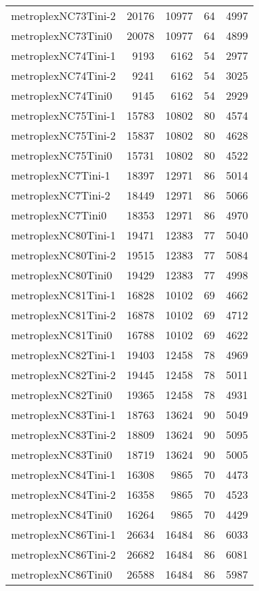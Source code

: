 \begin{longtable}{lrrrr}
metroplexNC73Tini-2 & 20176 & 10977 & 64 & 4997 \\
metroplexNC73Tini0 & 20078 & 10977 & 64 & 4899 \\
metroplexNC74Tini-1 & 9193 & 6162 & 54 & 2977 \\
metroplexNC74Tini-2 & 9241 & 6162 & 54 & 3025 \\
metroplexNC74Tini0 & 9145 & 6162 & 54 & 2929 \\
metroplexNC75Tini-1 & 15783 & 10802 & 80 & 4574 \\
metroplexNC75Tini-2 & 15837 & 10802 & 80 & 4628 \\
metroplexNC75Tini0 & 15731 & 10802 & 80 & 4522 \\
metroplexNC7Tini-1 & 18397 & 12971 & 86 & 5014 \\
metroplexNC7Tini-2 & 18449 & 12971 & 86 & 5066 \\
metroplexNC7Tini0 & 18353 & 12971 & 86 & 4970 \\
metroplexNC80Tini-1 & 19471 & 12383 & 77 & 5040 \\
metroplexNC80Tini-2 & 19515 & 12383 & 77 & 5084 \\
metroplexNC80Tini0 & 19429 & 12383 & 77 & 4998 \\
metroplexNC81Tini-1 & 16828 & 10102 & 69 & 4662 \\
metroplexNC81Tini-2 & 16878 & 10102 & 69 & 4712 \\
metroplexNC81Tini0 & 16788 & 10102 & 69 & 4622 \\
metroplexNC82Tini-1 & 19403 & 12458 & 78 & 4969 \\
metroplexNC82Tini-2 & 19445 & 12458 & 78 & 5011 \\
metroplexNC82Tini0 & 19365 & 12458 & 78 & 4931 \\
metroplexNC83Tini-1 & 18763 & 13624 & 90 & 5049 \\
metroplexNC83Tini-2 & 18809 & 13624 & 90 & 5095 \\
metroplexNC83Tini0 & 18719 & 13624 & 90 & 5005 \\
metroplexNC84Tini-1 & 16308 & 9865 & 70 & 4473 \\
metroplexNC84Tini-2 & 16358 & 9865 & 70 & 4523 \\
metroplexNC84Tini0 & 16264 & 9865 & 70 & 4429 \\
metroplexNC86Tini-1 & 26634 & 16484 & 86 & 6033 \\
metroplexNC86Tini-2 & 26682 & 16484 & 86 & 6081 \\
metroplexNC86Tini0 & 26588 & 16484 & 86 & 5987 \\

\end{longtable}
